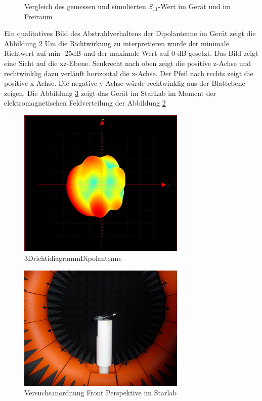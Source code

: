 \begin{figure}[!ht]
	\centering
	\begingroup
	
	\endgroup
	\caption{Vergleich des gemessen und simulierten $S_{11}$-Wert im Ger\"at und im Freiraum}	\label{S11_Messung_Simulation_Dipolantenn_Freiraum}
\end{figure}
\newpage
Ein qualitatives Bild des Abstrahlverhaltens der Dipolantenne im Gerät zeigt die Abbildung \ref{fig:3D Richtdiagramm} Um die Richtwirkung zu interpretieren wurde der minimale Richtwert auf min -25dB und der maximale Wert auf 0 dB gesetzt. Das Bild zeigt eine Sicht auf die xz-Ebene. Senkrecht nach oben zeigt die positive z-Achse und rechtwinklig dazu verläuft horizontal die x-Achse. Der Pfeil nach rechts zeigt die positive x-Achse. Die negative y-Achse würde rechtwinklig aus der Blattebene zeigen. Die Abbildung \ref{fig:FrontStarLab} zeigt das Gerät im StarLab im Moment der elektromagnetischen Feldverteilung der Abbildung \ref{fig:3D Richtdiagramm}\\
\begin{figure}[!h]
	\centering
	\includegraphics[width=8cm]{content/bilder/Implementierung/min25_0_x_yhinten_zoben.JPG}%
	\caption{3DrichtidiagrammDipolantenne}
	\label{fig:3D Richtdiagramm}
\end{figure}
\begin{figure}[!h]
	\centering
	\includegraphics[width=8cm]{content/bilder/Implementierung/Front.JPG}%
	\caption{Versuchsanordnung Front Perspektive im Starlab}
	\label{fig:FrontStarLab}
\end{figure}
